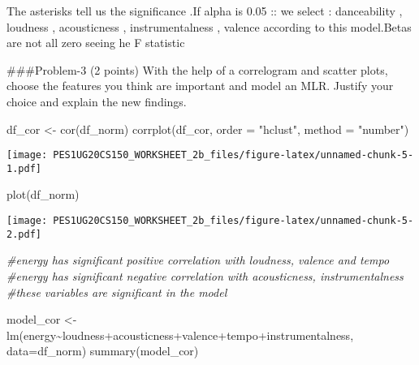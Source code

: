 \documentclass[
]{article}
\newenvironment{Shaded}{\begin{snugshade}}{\end{snugshade}}
\newcommand{\AttributeTok}[1]{\textcolor[rgb]{0.77,0.63,0.00}{#1}}
\newcommand{\CommentTok}[1]{\textcolor[rgb]{0.56,0.35,0.01}{\textit{#1}}}
\newcommand{\FunctionTok}[1]{\textcolor[rgb]{0.00,0.00,0.00}{#1}}
\newcommand{\NormalTok}[1]{#1}
\newcommand{\OtherTok}[1]{\textcolor[rgb]{0.56,0.35,0.01}{#1}}
\newcommand{\SpecialCharTok}[1]{\textcolor[rgb]{0.00,0.00,0.00}{#1}}
\newcommand{\StringTok}[1]{\textcolor[rgb]{0.31,0.60,0.02}{#1}}
\begin{document}
The asterisks tell us the significance .If alpha is 0.05 :: we select :
danceability , loudness , acousticness , instrumentalness , valence
according to this model.Betas are not all zero seeing he F statistic

\#\#\#Problem-3 (2 points) With the help of a correlogram and scatter
plots, choose the features you think are important and model an MLR.
Justify your choice and explain the new findings.

\begin{Shaded}
\begin{Highlighting}[]
\NormalTok{df\_cor }\OtherTok{\textless{}{-}} \FunctionTok{cor}\NormalTok{(df\_norm)}
\FunctionTok{corrplot}\NormalTok{(df\_cor, }\AttributeTok{order =} \StringTok{"hclust"}\NormalTok{, }\AttributeTok{method =} \StringTok{"number"}\NormalTok{)}
\end{Highlighting}
\end{Shaded}

\texttt{[image: PES1UG20CS150\_WORKSHEET\_2b\_files/figure-latex/unnamed-chunk-5-1.pdf]}

\begin{Shaded}
\begin{Highlighting}[]
\FunctionTok{plot}\NormalTok{(df\_norm)}
\end{Highlighting}
\end{Shaded}

\texttt{[image: PES1UG20CS150\_WORKSHEET\_2b\_files/figure-latex/unnamed-chunk-5-2.pdf]}

\begin{Shaded}
\begin{Highlighting}[]
\CommentTok{\#energy has significant positive correlation with loudness, valence and tempo}
\CommentTok{\#energy has significant negative correlation with acousticness, instrumentalness}
\CommentTok{\#these variables are significant in the model}

\NormalTok{model\_cor }\OtherTok{\textless{}{-}} \FunctionTok{lm}\NormalTok{(energy}\SpecialCharTok{\textasciitilde{}}\NormalTok{loudness}\SpecialCharTok{+}\NormalTok{acousticness}\SpecialCharTok{+}\NormalTok{valence}\SpecialCharTok{+}\NormalTok{tempo}\SpecialCharTok{+}\NormalTok{instrumentalness, }\AttributeTok{data=}\NormalTok{df\_norm)}
\FunctionTok{summary}\NormalTok{(model\_cor)}
\end{Highlighting}
\end{Shaded}
\end{document}
